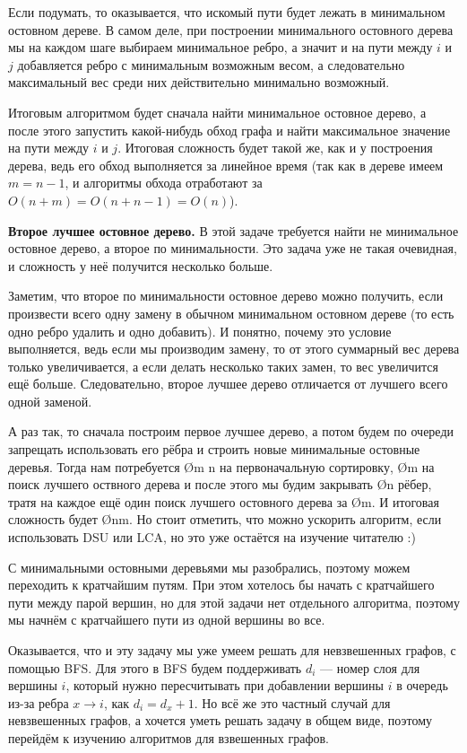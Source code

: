 Если подумать, то оказывается, что искомый пути будет лежать в минимальном остовном дереве. В самом деле, при построении минимального остовного дерева мы на каждом шаге выбираем минимальное ребро, а значит и на пути между $i$ и $j$ добавляется ребро с минимальным возможным весом, а следовательно максимальный вес среди них действительно минимально возможный.

Итоговым алгоритмом будет сначала найти минимальное остовное дерево, а после этого запустить какой-нибудь обход графа и найти максимальное значение на пути между $i$ и $j$. Итоговая сложность будет такой же, как и у построения дерева, ведь его обход выполняется за линейное время (так как в дереве имеем $m = n - 1$, и алгоритмы обхода отработают за $O(n + m) = O(n + n - 1) = O(n)$).

\textbf{Второе лучшее остовное дерево.} В этой задаче требуется найти не минимальное остовное дерево, а второе по минимальности. Это задача уже не такая очевидная, и сложность у неё получится несколько больше.

Заметим, что второе по минимальности остовное дерево можно получить, если произвести всего одну замену в обычном минимальном остовном дереве (то есть одно ребро удалить и одно добавить). И понятно, почему это условие выполняется, ведь если мы производим замену, то от этого суммарный вес дерева только увеличивается, а если делать несколько таких замен, то вес увеличится ещё больше. Следовательно, второе лучшее дерево отличается от лучшего всего одной заменой.

А раз так, то сначала построим первое лучшее дерево, а потом будем по очереди запрещать использовать его рёбра и строить новые минимальные остовные деревья. Тогда нам потребуется \O{m \log n} на первоначальную сортировку, \O{m} на поиск лучшего оствного дерева и после этого мы будим закрывать \O{n} рёбер, тратя на каждое ещё один поиск лучшего остовного дерева за \O{m}. И итоговая сложность будет \O{nm}. Но стоит отметить, что можно ускорить алгоритм, если использовать DSU или LCA, но это уже остаётся на изучение читателю :)


С минимальными остовными деревьями мы разобрались, поэтому можем переходить к кратчайшим путям. При этом хотелось бы начать с кратчайшего пути между парой вершин, но для этой задачи нет отдельного алгоритма, поэтому мы начнём с кратчайшего пути из одной вершины во все.

Оказывается, что и эту задачу мы уже умеем решать для невзвешенных графов, с помощью BFS. Для этого в BFS будем поддерживать $d_i$ — номер слоя для вершины $i$, который нужно пересчитывать при добавлении вершины $i$ в очередь из-за ребра $x \to i$, как $d_i = d_x + 1$. Но всё же это частный случай для невзвешенных графов, а хочется уметь решать задачу в общем виде, поэтому перейдём к изучению алгоритмов для взвешенных графов.

